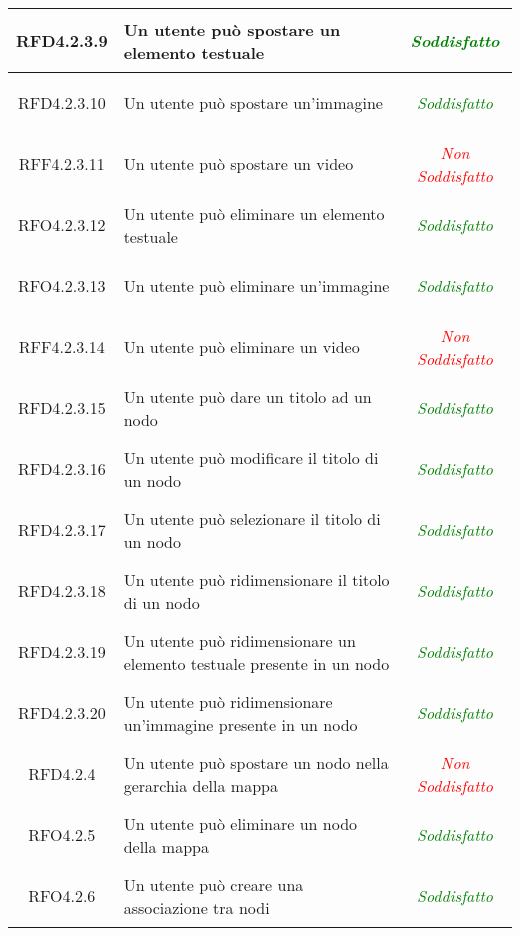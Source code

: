 \begin{longtable}{|c|>{\centering}m{7cm}|c|}
\hypertarget{RFD4.2.3.9}{RFD4.2.3.9} & Un utente può spostare un elemento testuale & \textcolor{Green}{\textit{Soddisfatto}}\\ \hline
\hypertarget{RFD4.2.3.10}{RFD4.2.3.10} & Un utente può spostare un’immagine & \textcolor{Green}{\textit{Soddisfatto}}\\ \hline
\hypertarget{RFF4.2.3.11}{RFF4.2.3.11} & Un utente può spostare un video & \textcolor{Red}{\textit{Non Soddisfatto}}\\ \hline
\hypertarget{RFO4.2.3.12}{RFO4.2.3.12} & Un utente può eliminare un elemento testuale & \textcolor{Green}{\textit{Soddisfatto}}\\ \hline
\hypertarget{RFO4.2.3.13}{RFO4.2.3.13} & Un utente può eliminare un’immagine & \textcolor{Green}{\textit{Soddisfatto}}\\ \hline
\hypertarget{RFF4.2.3.14}{RFF4.2.3.14} & Un utente può eliminare un video & \textcolor{Red}{\textit{Non Soddisfatto}}\\ \hline
\hypertarget{RFD4.2.3.15}{RFD4.2.3.15} & Un utente può dare un titolo ad un nodo & \textcolor{Green}{\textit{Soddisfatto}}\\ \hline
\hypertarget{RFD4.2.3.16}{RFD4.2.3.16} & Un utente può modificare il titolo di un nodo & \textcolor{Green}{\textit{Soddisfatto}}\\ \hline
\hypertarget{RFD4.2.3.17}{RFD4.2.3.17} & Un utente può selezionare il titolo di un nodo & \textcolor{Green}{\textit{Soddisfatto}}\\ \hline
\hypertarget{RFD4.2.3.18}{RFD4.2.3.18} & Un utente può ridimensionare il titolo di un nodo & \textcolor{Green}{\textit{Soddisfatto}}\\ \hline
\hypertarget{RFD4.2.3.19}{RFD4.2.3.19} & Un utente può ridimensionare un elemento testuale presente in un nodo
& \textcolor{Green}{\textit{Soddisfatto}}\\ \hline
\hypertarget{RFD4.2.3.20}{RFD4.2.3.20} & Un utente può ridimensionare un’immagine presente in un nodo & \textcolor{Green}{\textit{Soddisfatto}}\\ \hline
\hypertarget{RFD4.2.4}{RFD4.2.4} & Un utente può spostare un nodo nella gerarchia della mappa & \textcolor{Red}{\textit{Non Soddisfatto}}\\ \hline
\hypertarget{RFO4.2.5}{RFO4.2.5} & Un utente può eliminare un nodo della mappa & \textcolor{Green}{\textit{Soddisfatto}}\\ \hline
\hypertarget{RFO4.2.6}{RFO4.2.6} & Un utente può creare una associazione tra nodi & \textcolor{Green}{\textit{Soddisfatto}}\\ \hline

\end{longtable}
